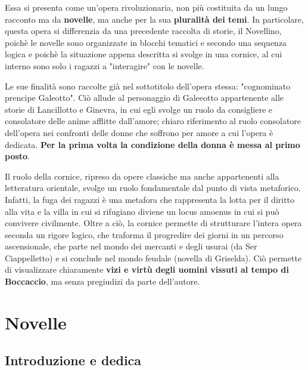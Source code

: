 \documentclass[10pt,a4paper]{article}
\begin{document}
	 Essa si presenta come un'opera rivoluzionaria, non più costituita da un lungo racconto ma da \textbf{novelle}, ma anche per la sua \textbf{pluralità dei temi}. In particolare, questa opera si differenzia da una precedente raccolta di storie, il Novellino, poichè le novelle sono organizzate in blocchi tematici e secondo una sequenza logica e poichè la situazione appena descritta si svolge in una cornice, al cui interno sono solo i ragazzi a "interagire" con le novelle.

		Le sue finalità sono raccolte già nel sottotitolo dell'opera stessa: "cognominato prencipe Galeotto". Ciò allude al personaggio di Galeeotto appartenente alle storie di Lancillotto e Ginevra, in cui egli svolge un ruolo da consigliere e consolatore delle anime afflitte dall'amore; chiaro riferimento al ruolo consolatore dell'opera nei confronti delle donne che soffrono per amore a cui l'opera è dedicata. \textbf{Per la prima volta la condizione della donna è messa al primo posto}.

		Il ruolo della cornice, ripreso da opere classiche ma anche appartenenti alla letteratura orientale, svolge un ruolo fondamentale dal punto di vista metaforico. Infatti, la fuga dei ragazzi è una metafora che rappresenta la lotta per il diritto alla vita e la villa in cui si rifugiano diviene un locus amoenus in cui si può convivere civilmente.
		Oltre a ciò, la cornice permette di strutturare l'intera opera seconda un rigore logico, che traforma il progredire dei giorni in un percorso ascensionale, che parte nel mondo dei mercanti e degli usurai (da Ser Ciappelletto) e si conclude nel mondo feudale (novella di Griselda). Ciò permette di visualizzare chiaramente \textbf{vizi e virtù degli uomini vissuti al tempo di Boccaccio}, ma senza pregiudizi da parte dell'autore.

\section{Novelle}

\subsection{Introduzione e dedica}
\end{document}
